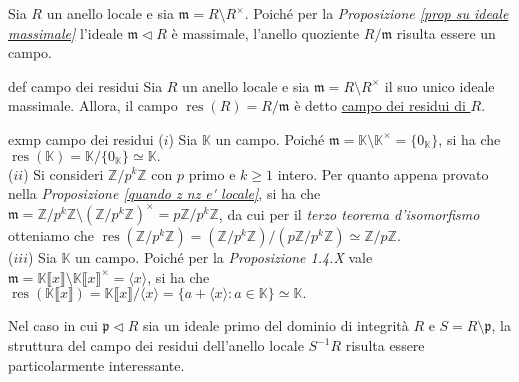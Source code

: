 \noindent Sia $R$ un anello locale e sia $\mathfrak{m}=R\setminus R^{\times}$. Poiché per la \emph{Proposizione \ref{prop su ideale massimale}} 
l'ideale $\mathfrak{m}\lhd R$ è massimale, l'anello quoziente $R/\mathfrak{m}$ risulta essere un campo.

\begin{defn}{def campo dei residui}
Sia $R$ un anello locale e sia $\mathfrak{m}=R\setminus R^{\times}$ il suo unico ideale massimale. Allora, il campo $\operatorname{res}(R)=R/\mathfrak{m}$ è detto \underline{campo dei residui di $R$}.
\end{defn}

\begin{example}[]{exmp campo dei residui}
  ($i$) Sia $\mathbb{K}$ un campo. Poiché $\mathfrak{m}=\mathbb{K}\setminus \mathbb{K}^{\times}=\{0_{\mathbb{K}}\}$, si ha che 
  $\operatorname{res}(\mathbb{K})=\mathbb{K}/\{0_{\mathbb{K}}\}\simeq \mathbb{K}.$\\

  \noindent ($ii$) Si consideri $\mathbb{Z}/p^k\mathbb{Z}$ con $p$ primo e $k\geq 1$ intero. Per quanto appena provato nella 
  \emph{Proposizione \ref{quando z nz e' locale}}, si ha che $\mathfrak{m}=\mathbb{Z}/p^k\mathbb{Z}\setminus 
  (\mathbb{Z}/p^k\mathbb{Z})^{\times}=p\mathbb{Z}/p^k\mathbb{Z}$, da cui per il \emph{terzo teorema d'isomorfismo} otteniamo che 
  $\operatorname{res}(\mathbb{Z}/p^k\mathbb{Z})=(\mathbb{Z}/p^k\mathbb{Z})/(p\mathbb{Z}/p^k\mathbb{Z})\simeq \mathbb{Z}/p\mathbb{Z}.$ \\

  \noindent ($iii$) Sia $\mathbb{K}$ un campo. Poiché per la \emph{Proposizione 1.4.X} vale 
  $\mathfrak{m}=\mathbb{K}\llbracket x\rrbracket\setminus\mathbb{K}\llbracket x\rrbracket^{\times}=\langle x \rangle$, si ha che 
  $\operatorname{res}(\mathbb{K}\llbracket x\rrbracket)=\mathbb{K}\llbracket x\rrbracket/\langle x\rangle = 
  \{a+\langle x\rangle : a\in \mathbb{K}\}\simeq \mathbb{K}.$
\end{example}

\noindent Nel caso in cui $\mathfrak{p}\lhd R$ sia un ideale primo del dominio di integrità $R$ e $S=R\setminus \mathfrak{p}$, 
la struttura del campo dei residui dell'anello locale $S^{-1}R$ risulta essere particolarmente interessante.

